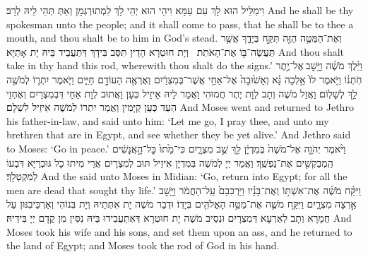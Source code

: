 {וִימַלֵּיל הוּא לָךְ עִם עַמָּא וִיהֵי הוּא יְהֵי לָךְ לִמְתוּרְגְּמָן וְאַתְּ תְּהֵי לֵיהּ לְרָב׃}
{And he shall be thy spokesman unto the people; and it shall come to pass, that he shall be to thee a mouth, and thou shalt be to him in God’s stead.}{}
{וְאֶת־הַמַּטֶּ֥ה הַזֶּ֖ה תִּקַּ֣ח בְּיָדֶ֑ךָ אֲשֶׁ֥ר תַּעֲשֶׂה־בּ֖וֹ אֶת־הָאֹתֹֽת׃ \petucha }
{וְיָת חוּטְרָא הָדֵין תִּסַּב בִּידָךְ דְּתַעֲבֵיד בֵּיהּ יָת אָתַיָּא׃}
{And thou shalt take in thy hand this rod, wherewith thou shalt do the signs.’}{}
{וַיֵּ֨לֶךְ מֹשֶׁ֜ה וַיָּ֣שׇׁב \legarmeh  אֶל־יֶ֣תֶר חֹֽתְנ֗וֹ וַיֹּ֤אמֶר לוֹ֙ אֵ֣לְכָה נָּ֗א וְאָשׁ֙וּבָה֙ אֶל־אַחַ֣י אֲשֶׁר־בְּמִצְרַ֔יִם וְאֶרְאֶ֖ה הַעוֹדָ֣ם חַיִּ֑ים וַיֹּ֧אמֶר יִתְר֛וֹ לְמֹשֶׁ֖ה לֵ֥ךְ לְשָׁלֽוֹם׃
}
{וַאֲזַל מֹשֶׁה וְתָב לְוָת יֶתֶר חֲמוּהִי וַאֲמַר לֵיהּ אֵיזֵיל כְּעַן וַאֲתוּב לְוָת אַחַי דִּבְמִצְרַיִם וְאֶחְזֵי הַעַד כְּעַן קַיָּמִין וַאֲמַר יִתְרוֹ לְמֹשֶׁה אִיזֵיל לִשְׁלָם׃}
{And Moses went and returned to Jethro his father-in-law, and said unto him: ‘Let me go, I pray thee, and unto my brethren that are in Egypt, and see whether they be yet alive.’ And Jethro said to Moses: ‘Go in peace.’}{}
{וַיֹּ֨אמֶר יְהֹוָ֤ה אֶל־מֹשֶׁה֙ בְּמִדְיָ֔ן לֵ֖ךְ שֻׁ֣ב מִצְרָ֑יִם כִּי־מֵ֙תוּ֙ כׇּל־הָ֣אֲנָשִׁ֔ים הַֽמְבַקְשִׁ֖ים אֶת־נַפְשֶֽׁךָ׃
}
{וַאֲמַר יְיָ לְמֹשֶׁה בְּמִדְיָן אִיזֵיל תּוּב לְמִצְרָיִם אֲרֵי מִיתוּ כָל גּוּבְרַיָּא דִּבְעוֹ לְמִקְטְלָךְ׃}
{And the \lord\space said unto Moses in Midian: ‘Go, return into Egypt; for all the men are dead that sought thy life.’}{}
{וַיִּקַּ֨ח מֹשֶׁ֜ה אֶת־אִשְׁתּ֣וֹ וְאֶת־בָּנָ֗יו וַיַּרְכִּבֵם֙ עַֽל־הַחֲמֹ֔ר וַיָּ֖שׇׁב אַ֣רְצָה מִצְרָ֑יִם וַיִּקַּ֥ח מֹשֶׁ֛ה אֶת־מַטֵּ֥ה הָאֱלֹהִ֖ים בְּיָדֽוֹ׃
}
{וּדְבַר מֹשֶׁה יָת אִתְּתֵיהּ וְיָת בְּנוֹהִי וְאַרְכֵּיבִנּוּן עַל חֲמָרָא וְתָב לְאַרְעָא דְּמִצְרָיִם וּנְסֵיב מֹשֶׁה יָת חוּטְרָא דְּאִתְעֲבִידוּ בֵּיהּ נִסִּין מִן קֳדָם יְיָ בִּידֵיהּ׃}
{And Moses took his wife and his sons, and set them upon an ass, and he returned to the land of Egypt; and Moses took the rod of God in his hand.}{}
